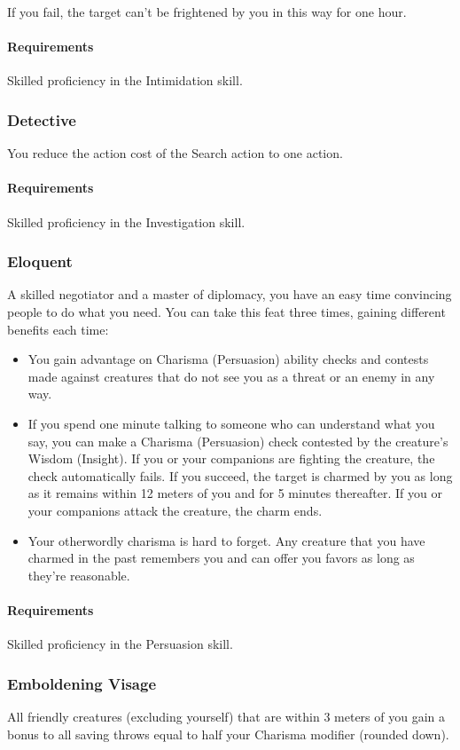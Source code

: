     If you fail, the target can't be frightened by you in this way for one hour.
    \paragraph{Requirements} Skilled proficiency in the Intimidation skill.
\subsubsection{Detective} \label{feat::detective}
    You reduce the action cost of the Search action to one action.
    \paragraph{Requirements} Skilled proficiency in the Investigation skill.
\subsubsection{Eloquent} \label{feat::eloquent}
    A skilled negotiator and a master of diplomacy, you have an easy time convincing people to do what you need.
    You can take this feat three times, gaining different benefits each time:
    \begin{itemize}
        \item You gain advantage on Charisma (Persuasion) ability checks and contests made against creatures that do not see you as a threat or an enemy in any way.
        \item If you spend one minute talking to someone who can understand what you say, you can make a Charisma (Persuasion) check contested by the creature's Wisdom (Insight).
        If you or your companions are fighting the creature, the check automatically fails.
        If you succeed, the target is charmed by you as long as it remains within 12 meters of you and for 5 minutes thereafter.
        If you or your companions attack the creature, the charm ends.
        \item Your otherwordly charisma is hard to forget.
        Any creature that you have charmed in the past remembers you and can offer you favors as long as they're reasonable.
    \end{itemize}
    \paragraph{Requirements} Skilled proficiency in the Persuasion skill.
\subsubsection{Emboldening Visage} \label{feat::emboldeningvisage}
    All friendly creatures (excluding yourself) that are within 3 meters of you gain a bonus to all saving throws equal to half your Charisma modifier (rounded down).

